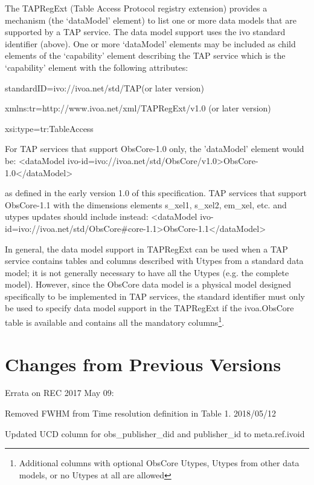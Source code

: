 \documentclass[11pt,a4paper]{ivoa}
\begin{document}
The TAPRegExt (Table Access Protocol registry extension) \citep{2012ivoa.spec.0827D}  provides a mechanism (the
`dataModel' element) to list one or more data models that are supported by a TAP service. The data model support uses
the ivo standard identifier (above). One or more `dataModel' elements may be included as child elements of the
{}`capability' element describing the TAP service which is the `capability' element with the following attributes:

standardID={\textquotedbl}ivo://ivoa.net/std/TAP{\textquotedbl}(or later version)

xmlns:tr={\textquotedbl}http://www.ivoa.net/xml/TAPRegExt/v1.0{\textquotedbl} (or later version)

xsi:type={\textquotedbl}tr:TableAccess{\textquotedbl}

For TAP services that support ObsCore-1.0 only, the {}'dataModel' element would be:   {\textless}dataModel
ivo-id={\textquotedbl}ivo://ivoa.net/std/ObsCore/v1.0{\textquotedbl}{\textgreater}ObsCore-1.0{\textless}/dataModel{\textgreater}


as defined in the early version 1.0 of this specification.  TAP services that support ObsCore-1.1 with the dimensions
elements s\_xel1, s\_xel2, em\_xel, etc. and utypes updates should include instead:  {\textless}dataModel
ivo-id={\textquotedbl}ivo://ivoa.net/std/ObsCore\#core-1.1{\textquotedbl}{\textgreater}ObsCore-1.1{\textless}/dataModel{\textgreater}


In general, the data model support in TAPRegExt can be used when a TAP service contains tables and columns described
with Utypes from a standard data model; it is not generally necessary to have all the Utypes (e.g. the complete model).
However, since the ObsCore data model is a physical model designed specifically to be implemented in TAP services, the
standard identifier must only be used to specify data model support in the TAPRegExt if the ivoa.ObsCore table is
available and contains all the mandatory columns\footnote{ Additional columns with optional ObsCore Utypes, Utypes from
other data models, or no Utypes at all are allowed}.


\section{Changes from Previous Versions}
Errata on REC 2017 May 09:

Removed FWHM from Time resolution definition in Table 1. 2018/05/12

Updated UCD column for obs\_publisher\_did and publisher\_id to meta.ref.ivoid
\end{document}
